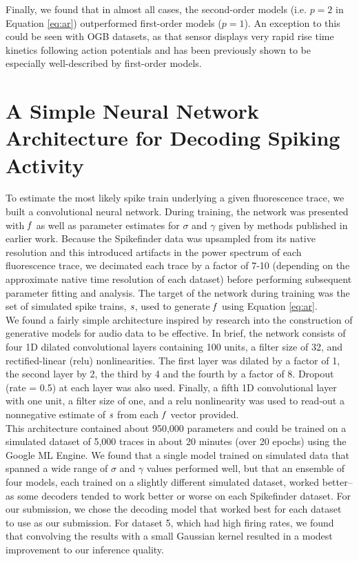 \documentclass[fleqn,10pt]{wlscirep}
\begin{document}
Finally, we found that in almost all cases, the second-order models (i.e. $p=2$ in Equation \ref{eq:ar}) outperformed first-order models ($p=1$). An exception to this could be seen with OGB datasets, as that sensor displays very rapid rise time kinetics following action potentials and has been previously shown to be especially well-described by first-order models.\cite{oopsi}

\section{A Simple Neural Network Architecture for Decoding Spiking Activity}

To estimate the most likely spike train underlying a given fluorescence trace, we built a convolutional neural network. During training, the network was presented with $\it{f}$ as well as parameter estimates for $\sigma$ and $\gamma$ given by methods published in earlier work.\cite{eftychios} Because the Spikefinder data was upsampled from its native resolution and this introduced artifacts in the power spectrum of each fluorescence trace, we decimated each trace by a factor of 7-10 (depending on the approximate native time resolution of each dataset) before performing subsequent parameter fitting and analysis. The target of the network during training was the set of simulated spike trains, $\it{s}$, used to generate $\it{f}$ using Equation \ref{eq:ar}. \\

We found a fairly simple architecture inspired by research into the construction of generative models for audio data to be effective.\cite{wavenet} In brief, the network consists of four 1D dilated convolutional layers containing 100 units, a filter size of 32, and rectified-linear (relu) nonlinearities. The first layer was dilated by a factor of 1, the second layer by 2, the third by 4 and the fourth by a factor of 8. Dropout (rate = 0.5) at each layer was also used. Finally, a fifth 1D convolutional layer with one unit, a filter size of one, and a relu nonlinearity was used to read-out a nonnegative estimate of $\it{s}$ from each $\it{f}$ vector provided. \\

This architecture contained about 950,000 parameters and could be trained on a simulated dataset of 5,000 traces in about 20 minutes (over 20 epochs) using the Google ML Engine. We found that a single model trained on simulated data that spanned a wide range of $\sigma$ and $\gamma$ values performed well, but that an ensemble of four models, each trained on a slightly different simulated dataset, worked better--as some decoders tended to work better or worse on each Spikefinder dataset. For our submission, we chose the decoding model that worked best for each dataset to use as our submission. For dataset 5, which had high firing rates, we found that convolving the results with a small Gaussian kernel resulted in a modest improvement to our inference quality.
\end{document}
